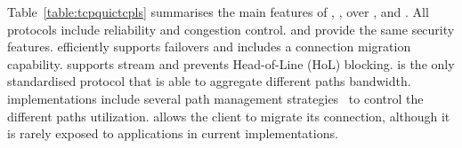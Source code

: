 Table~\ref{table:tcpquictcpls} summarises the main features of \tcp, \mptcp,
\tls over \tcp, and \quic. All protocols include reliability and congestion
control. \tls and \quic provide the same security features. \mptcp efficiently
supports failovers and \quic includes a connection migration capability. \quic
supports stream and prevents Head-of-Line (HoL) blocking. \mptcp is the only
standardised protocol that is able to aggregate different paths bandwidth.
\mptcp implementations include several path management
strategies~\cite{hesmans2015smapp,hesmans2016enhanced} to control the different
paths utilization. \quic allows the client to migrate its connection, although
it is rarely exposed to applications in current implementations.













